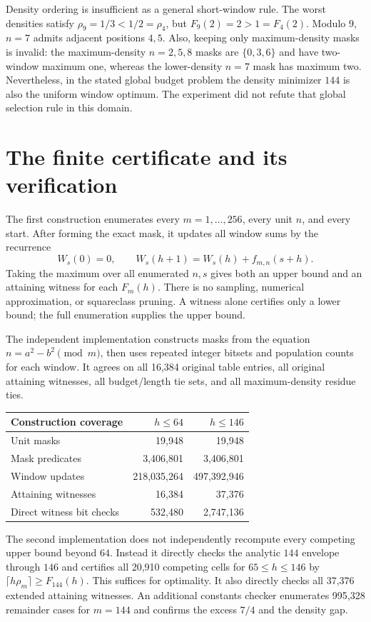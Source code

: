 \documentclass[11pt]{article}
\begin{document}
Density ordering is insufficient as a general short-window rule. The
worst densities satisfy $\rho_9=1/3<1/2=\rho_4$, but
$F_9(2)=2>1=F_4(2)$. Modulo $9$, $n=7$ admits adjacent positions $4,5$.
Also, keeping only maximum-density masks is invalid: the maximum-density
$n=2,5,8$ masks are $\{0,3,6\}$ and have two-window maximum one, whereas
the lower-density $n=7$ mask has maximum two. Nevertheless, in the stated
global budget problem the density minimizer $144$ is also the uniform
window optimum. The experiment did not refute that global selection rule
in this domain.

\section{The finite certificate and its verification}\label{sec:certificate}

The first construction enumerates every $m=1,\ldots,256$, every unit $n$,
and every start. After forming the exact mask, it updates all window sums
by the recurrence
\[
 W_s(0)=0,\qquad W_s(h+1)=W_s(h)+f_{m,n}(s+h).
\]
Taking the maximum over all enumerated $n,s$ gives both an upper bound and
an attaining witness for each $F_m(h)$. There is no sampling, numerical
approximation, or squareclass pruning. A witness alone certifies only a
lower bound; the full enumeration supplies the upper bound.

The independent implementation constructs masks from the equation
$n=a^2-b^2\pmod m$, then uses repeated integer bitsets and population
counts for each window. It agrees on all 16,384 original table entries,
all original attaining witnesses, all budget/length tie sets, and all
maximum-density residue ties.

\begin{center}
\begin{tabular}{lrr}
\toprule
Construction coverage&$h\le64$&$h\le146$\\
\midrule
Unit masks&19,948&19,948\\
Mask predicates&3,406,801&3,406,801\\
Window updates&218,035,264&497,392,946\\
Attaining witnesses&16,384&37,376\\
Direct witness bit checks&532,480&2,747,136\\
\bottomrule
\end{tabular}
\end{center}

The second implementation does not independently recompute every competing
upper bound beyond $64$. Instead it directly checks the analytic $144$
envelope through $146$ and certifies all 20,910 competing cells for
$65\le h\le146$ by
$\lceil h\rho_m\rceil\ge F_{144}(h)$. This suffices for optimality.
It also directly checks all 37,376 extended attaining witnesses. An
additional constants checker enumerates 995,328 remainder cases for
$m=144$ and confirms the excess $7/4$ and the density gap.
\end{document}
